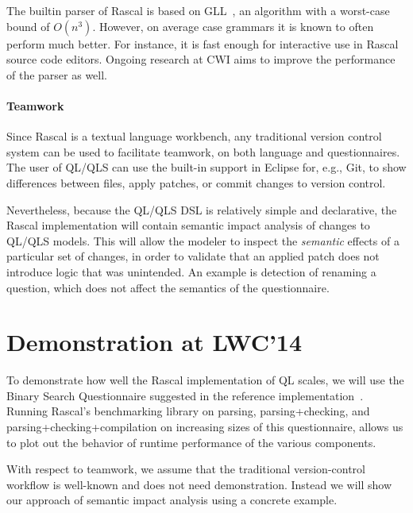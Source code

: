 \documentclass[a4paper]{article}
\begin{document}
The builtin parser of Rascal is based on GLL~\cite{GLLPTGEN}, an
algorithm with a worst-case bound of $O(n^3)$. However, on average
case grammars it is known to often perform much better. For instance,
it is fast enough for interactive use in Rascal source code editors.
Ongoing research at CWI aims to improve the performance of the parser
as well.


\paragraph{Teamwork}
Since Rascal is a textual language workbench, any traditional version
control system can be used to facilitate teamwork, on both language and
questionnaires. The user of QL/QLS can use the built-in support in
Eclipse for, e.g., Git, to show differences between files, apply
patches, or commit changes to version control. 

Nevertheless, because the QL/QLS DSL is relatively simple and
declarative, the Rascal implementation will contain semantic impact
analysis of changes to QL/QLS models. This will allow the modeler to
inspect the \textit{semantic} effects of a particular set of changes,
in order to validate that an applied patch does not introduce logic
that was unintended. An example is detection of renaming a question,
which does not affect the semantics of the questionnaire.

\section{Demonstration at LWC'14}

To demonstrate how well the Rascal implementation of QL scales, we will
use the Binary Search Questionnaire suggested in the reference
implementation~\cite{ReferenceImpl}. Running Rascal's benchmarking
library on parsing, parsing+checking, and parsing+checking+compilation
on increasing sizes of this questionnaire, allows us to plot out the
behavior of runtime performance of the various components. 

With respect to teamwork, we assume that the traditional
version-control workflow is well-known and does not need
demonstration. Instead we will show our approach of semantic impact
analysis using a concrete example. 





\end{document}
